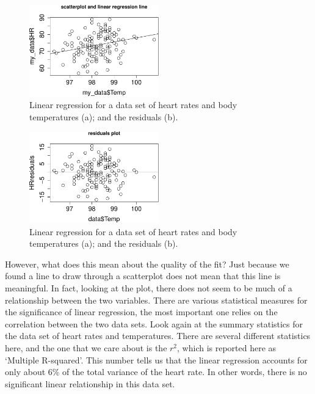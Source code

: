 \documentclass[
  letterpaper,
  DIV=11,
  numbers=noendperiod]{scrreprt}
\begin{document}
\begin{figure}[H]

{\centering \includegraphics[width=0.5\textwidth,height=\textheight]{./linreg_files/figure-pdf/linreg-HRTemp-1.pdf}

}

\caption{Linear regression for a data set of heart rates and body
temperatures (a); and the residuals (b).}

\end{figure}

\begin{figure}[H]

{\centering \includegraphics[width=0.5\textwidth,height=\textheight]{./linreg_files/figure-pdf/linreg-HRTemp-2.pdf}

}

\caption{Linear regression for a data set of heart rates and body
temperatures (a); and the residuals (b).}

\end{figure}

However, what does this mean about the quality of the fit? Just because
we found a line to draw through a scatterplot does not mean that this
line is meaningful. In fact, looking at the plot, there does not seem to
be much of a relationship between the two variables. There are various
statistical measures for the significance of linear regression, the most
important one relies on the correlation between the two data sets. Look
again at the summary statistics for the data set of heart rates and
temperatures. There are several different statistics here, and the one
that we care about is the \(r^2\), which is reported here as `Multiple
R-squared'. This number tells us that the linear regression accounts for
only about 6\% of the total variance of the heart rate. In other words,
there is no significant linear relationship in this data set.
\end{document}
